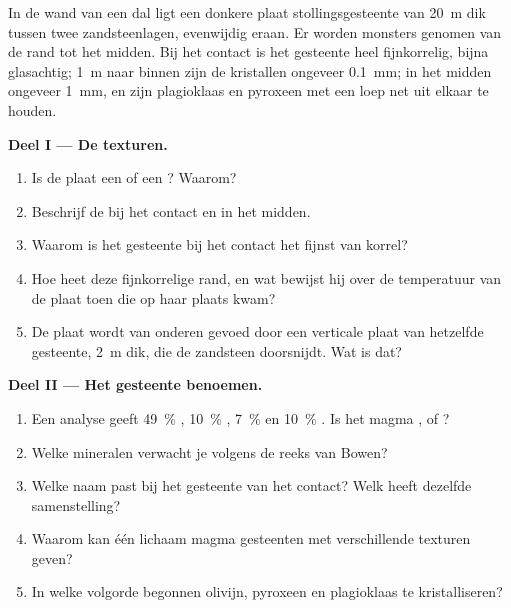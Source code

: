 \begin{problem}
\label{pb:g11:igneous-rocks:1}
In de wand van een dal ligt een donkere plaat stollingsgesteente van \qty{20}{m} dik
tussen twee zandsteenlagen, evenwijdig eraan. Er worden monsters genomen van
de rand tot het midden. Bij het contact is het gesteente heel fijnkorrelig, bijna
glasachtig; \qty{1}{m} naar binnen zijn de kristallen ongeveer \qty{0.1}{mm}; in het
midden ongeveer \qty{1}{mm}, en zijn plagioklaas en pyroxeen met een loep net uit elkaar
te houden.

\medskip
\noindent\textbf{Deel I --- De texturen.}
\begin{enumerate}
  \item Is de plaat een  of een ? Waarom?
  \item Beschrijf de  bij het contact en in het midden.
  \item Waarom is het gesteente bij het contact het fijnst van korrel?
  \item Hoe heet deze fijnkorrelige rand, en wat bewijst hij over
        de temperatuur van de plaat toen die op haar plaats kwam?
  \item De plaat wordt van onderen gevoed door een verticale plaat van hetzelfde gesteente,
        \qty{2}{m} dik, die de zandsteen doorsnijdt. Wat is dat?
\end{enumerate}

\medskip
\noindent\textbf{Deel II --- Het gesteente benoemen.}
\begin{enumerate}[resume]
  \item Een analyse geeft \qty{49}{\percent} , \qty{10}{\percent}
        , \qty{7}{\percent}  en \qty{10}{\percent}
        . Is het magma ,  of ?
  \item Welke mineralen verwacht je volgens de reeks van Bowen?
  \item Welke naam past bij het gesteente van het contact? Welk  heeft
        dezelfde samenstelling?
  \item Waarom kan één lichaam magma gesteenten met verschillende texturen geven?
  \item In welke volgorde begonnen olivijn, pyroxeen en plagioklaas te
        kristalliseren?
\end{enumerate}


\end{problem}
